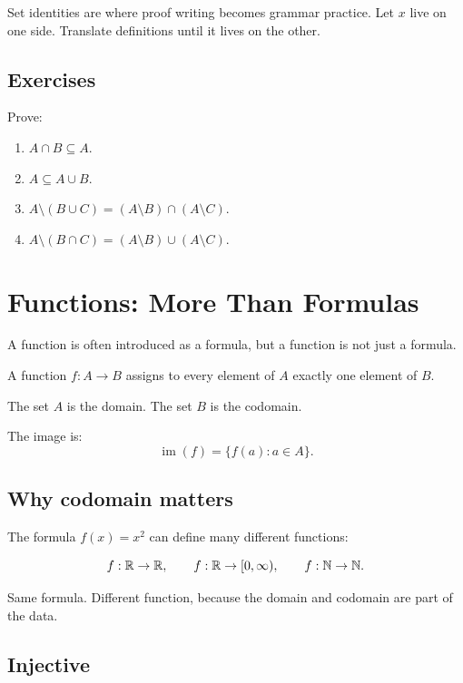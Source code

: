 \documentclass[11pt]{article}
\begin{document}
\begin{focusbox}
Set identities are where proof writing becomes grammar practice. Let $x$ live on one side. Translate definitions until it lives on the other.
\end{focusbox}

\subsection{Exercises}

Prove:

\begin{enumerate}
\item $A\cap B\subseteq A$.
\item $A\subseteq A\cup B$.
\item $A\setminus(B\cup C)=(A\setminus B)\cap(A\setminus C)$.
\item $A\setminus(B\cap C)=(A\setminus B)\cup(A\setminus C)$.
\end{enumerate}

\newpage
\section{Functions: More Than Formulas}

A function is often introduced as a formula, but a function is not just a formula.

\begin{definition}
A function $f:A\to B$ assigns to every element of $A$ exactly one element of $B$.
\end{definition}

The set $A$ is the domain. The set $B$ is the codomain.

The image is:
\[
\operatorname{im}(f)=\{f(a):a\in A\}.
\]

\subsection{Why codomain matters}

The formula $f(x)=x^2$ can define many different functions:

\[
f:\mathbb{R}\to\mathbb{R},\qquad f:\mathbb{R}\to[0,\infty),\qquad f:\mathbb{N}\to\mathbb{N}.
\]

Same formula. Different function, because the domain and codomain are part of the data.

\subsection{Injective}
\end{document}
